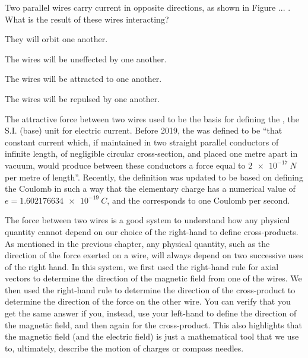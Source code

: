 \begin{checkpoint}{}
	\begin{MCquestion}{Two parallel wires carry current in opposite directions, as shown in Figure ... . What is the result of these wires interacting?}
		\item They will orbit one another.
		\item The wires will be uneffected by one another.
		\item The wires will be attracted to one another.
		\item The wires will be repulsed by one another. \correct
	\end{MCquestion}
\end{checkpoint}
The attractive force between two wires used to be the basis for defining the \ampere, the S.I. (base) unit for electric current. Before 2019, the \amperesp was defined to be ``that constant current which, if maintained in two straight parallel conductors of infinite length, of negligible circular cross-section, and placed one metre apart in vacuum, would produce between these conductors a force equal to $\SI{2e-17}{N}$ per metre of length''. Recently, the definition was updated to be based on defining the Coulomb in such a way that the elementary charge has a numerical value of $e=\SI{1.602176634e-19}{C}$, and the \amperesp corresponds to one Coulomb per second.

The force between two wires is a good system to understand how any physical quantity cannot depend on our choice of the right-hand to define cross-products. As mentioned in the previous chapter, any physical quantity, such as the direction of the force exerted on a wire, will always depend on two successive uses of the right hand. In this system, we first used the right-hand rule for axial vectors to determine the direction of the magnetic field from one of the wires. We then used the right-hand rule to determine the direction of the cross-product to determine the direction of the force on the other wire. You can verify that you get the same answer if you, instead, use your left-hand to define the direction of the magnetic field, and then again for the cross-product. This also highlights that the magnetic field (and the electric field) is just a mathematical tool that we use to, ultimately, describe the motion of charges or compass needles.



